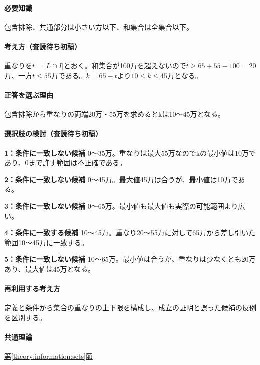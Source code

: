 \paragraph{必要知識} 包含排除、共通部分は小さい方以下、和集合は全集合以下。

\paragraph{考え方（査読待ち初稿）} 重なりを\(t=|L\cap I|\)とおく。和集合が100万を超えないので\(t\ge65+55-100=20\)万、一方\(t\le55\)万である。\(k=65-t\)より\(10\le k\le45\)万となる。

\paragraph{正答を選ぶ理由} 包含排除から重なりの両端20万・55万を求めるとkは10〜45万となる。

\paragraph{選択肢の検討（査読待ち初稿）}\mbox{}\par

\noindent\textbf{1：条件に一致しない候補} 0〜35万。重なりは最大55万なのでkの最小値は10万であり、0まで許す範囲は不正確である。\par

\noindent\textbf{2：条件に一致しない候補} 0〜45万。最大値45万は合うが、最小値は10万である。\par

\noindent\textbf{3：条件に一致しない候補} 0〜65万。最小値も最大値も実際の可能範囲より広い。\par

\noindent\textbf{4：条件に一致する候補} 10〜45万。重なり20〜55万に対して65万から差し引いた範囲10〜45万に一致する。\par

\noindent\textbf{5：条件に一致しない候補} 10〜65万。最小値は合うが、重なりは少なくとも20万あり、最大値は45万となる。\par

\paragraph{再利用する考え方} 定義と条件から集合の重なりの上下限を構成し、成立の証明と誤った候補の反例を区別する。

\paragraph{共通理論} \hyperref[theory:information:sets]{第\ref*{theory:information:sets}節}

